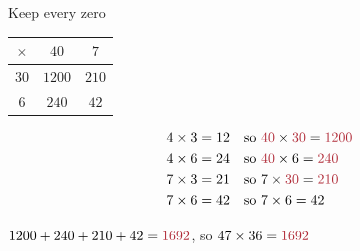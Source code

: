\documentclass[10pt,aspectratio=169]{beamer}
\newcommand{\hl}[1]{\textcolor{mmred}{#1}}
\begin{document}
\begin{frame}{Keep every zero}
  \begin{center}
    \begin{tabular}{|c|c|c|}\hline
      \bfseries $\times$ & \bfseries $40$ & \bfseries $7$\\\hline
      \bfseries $30$ & $1200$ & $210$\\\hline
      \bfseries $6$  & $240$  & $42$\\\hline
    \end{tabular}
    \hspace{18pt}
    \begin{minipage}{0.42\textwidth}
      \begin{align*}
        4\times 3 &= 12 &&\text{so } \hl{40}\times \hl{30} = \hl{1200}\\
        4\times 6 &= 24 &&\text{so } \hl{40}\times 6 = \hl{240}\\
        7\times 3 &= 21 &&\text{so } 7\times \hl{30} = \hl{210}\\
        7\times 6 &= 42 &&\text{so } 7\times 6 = 42
      \end{align*}
    \end{minipage}
  \end{center}
  \vspace{4pt}
  \begin{center}
    \large $1200+240+210+42 = \hl{1692}$, \quad so $47\times 36 = \hl{1692}$
  \end{center}
  \vspace{4pt}
\end{frame}
\end{document}
